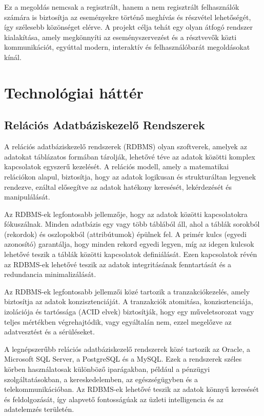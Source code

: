 \documentclass[colorlinks]{thesis-kando}
\theoremstyle{definition}
\theoremstyle{remark}
\begin{document}
 Ez a megoldás nemcsak a regisztrált, hanem a nem regisztrált felhasználók számára is biztosítja az eseményekre történő meghívás és részvétel lehetőségét, így szélesebb közönséget elérve. A projekt célja tehát egy olyan átfogó rendszer kialakítása, amely megkönnyíti az eseményszervezést és a résztvevők közti kommunikációt, egyúttal modern, interaktív és felhasználóbarát megoldásokat kínál.
\cite{Fazekas}

\chapter{Technológiai háttér}

\section{Relációs Adatbáziskezelő Rendszerek}

A relációs adatbáziskezelő rendszerek (RDBMS) olyan szoftverek, amelyek az adatokat táblázatos formában tárolják, lehetővé téve az adatok közötti komplex kapcsolatok egyszerű kezelését. A relációs modell, amely a matematikai relációkon alapul, biztosítja, hogy az adatok logikusan és strukturáltan legyenek rendezve, ezáltal elősegítve az adatok hatékony keresését, lekérdezését és manipulálását.

Az RDBMS-ek legfontosabb jellemzője, hogy az adatok közötti kapcsolatokra fókuszálnak. Minden adatbázis egy vagy több táblából áll, ahol a táblák sorokból (rekordok) és oszlopokból (attribútumok) épülnek fel. A primér kulcs (egyedi azonosító) garantálja, hogy minden rekord egyedi legyen, míg az idegen kulcsok lehetővé teszik a táblák közötti kapcsolatok definiálását. Ezen kapcsolatok révén az RDBMS-ek lehetővé teszik az adatok integritásának fenntartását és a redundancia minimalizálását.

Az RDBMS-ek legfontosabb jellemzői közé tartozik a tranzakciókezelés, amely biztosítja az adatok konzisztenciáját. A tranzakciók atomitása, konzisztenciája, izolációja és tartóssága (ACID elvek) biztosítják, hogy egy műveletsorozat vagy teljes mértékben végrehajtódik, vagy egyáltalán nem, ezzel megelőzve az adatvesztést és a sérüléseket.

A legnépszerűbb relációs adatbáziskezelő rendszerek közé tartozik az Oracle, a Microsoft SQL Server, a PostgreSQL és a MySQL. Ezek a rendszerek széles körben használatosak különböző iparágakban, például a pénzügyi szolgáltatásokban, a kereskedelemben, az egészségügyben és a telekommunikációban. Az RDBMS-ek lehetővé teszik az adatok könnyű keresését és feldolgozását, így alapvető fontosságúak az üzleti intelligencia és az adatelemzés területén.
\end{document}
